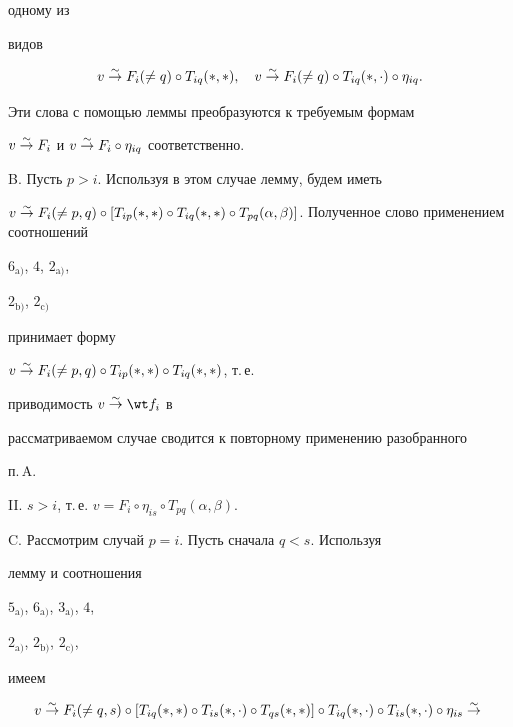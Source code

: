 \begin{pf}
одному из 


видов 


$$ 


v\simto F_i(\ne q)\circ T_{iq}(*,*),\quad 


v\simto F_i(\ne q)\circ T_{iq}(*,\cdot)\circ\eta_{iq}. 


$$ 


Эти слова с помощью леммы преобразуются к требуемым формам 


$v\overset{\sim}{\to}{} F_i$ и $v\overset{\sim}{\to}{} F_i\circ\eta_{iq}$ соответственно. 


 


B. Пусть $p>i$. Используя в этом случае лемму, будем иметь 


$v\simto F_i(\ne p,q)\circ[T_{ip}(*,*)\circ T_{iq}(*,*)\circ 


T_{pq}(\alpha,\beta)]$. Полученное слово применением соотношений 


$6_{\mathrm a)}$, $4$, $2_{\mathrm a)}$, 


$2_{\mathrm b)}$, $2_{\mathrm c)}$ 


принимает форму 


$v\overset{\sim}{\to}{} F_i(\ne p,q)\circ T_{ip}(*,*)\circ T_{iq}(*,*)$, т.\,е. 


приводимость $v\simto\wt f_i$ в 


рассматриваемом случае сводится к повторному применению разобранного 


п.\,A. 


 


II. $s>i$, т.\,е. $v=F_i\circ\eta_{is}\circ T_{pq}(\alpha,\beta)$. 


 


C. Рассмотрим случай $p=i$. Пусть сначала $q<s$. Используя 


лемму и соотношения 


$5_{\mathrm a)}$, $6_{\mathrm a)}$, $3_{\mathrm a)}$, $4$, 


$2_{\mathrm a)}$, $2_{\mathrm b)}$, $2_{\mathrm c)}$, 


имеем 


\begin{align*} 


v&\simto F_i(\ne q,s)\circ[T_{iq}(*,*)\circ T_{is}(*,\cdot)\circ 


T_{qs}(*,*)]\circ T_{iq}(*,\cdot)\circ 


T_{is}(*,\cdot)\circ\eta_{is}\simto \\ 



\end{align*}
\end{pf}
